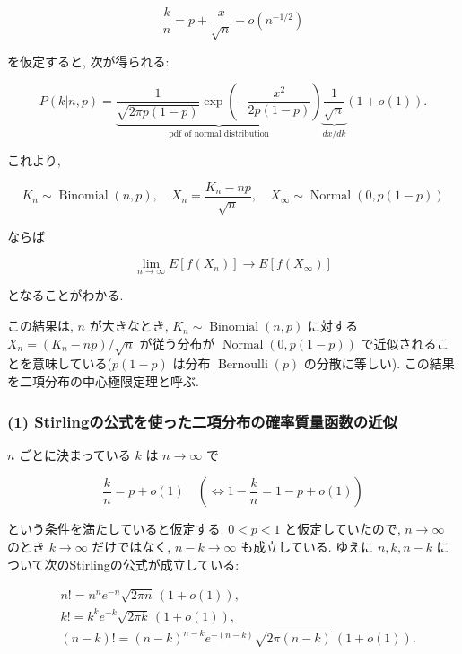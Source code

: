 \documentclass[
  letterpaper,
  DIV=11,
  numbers=noendperiod]{scrartcl}
\begin{document}
\[
\frac{k}{n} = p + \frac{x}{\sqrt{n}} + o(n^{-1/2})
\]

を仮定すると, 次が得られる:

\[
P(k|n,p) =
\underbrace{
\frac{1}{\sqrt{2\pi p(1-p)}} \exp\left(-\frac{x^2}{2p(1-p)}\right)
}_{\text{pdf of normal distribution}}
\underbrace{\frac{1}{\sqrt{n}}}_{dx/dk}
(1 + o(1)).
\]

これより,

\[
K_n \sim \operatorname{Binomial}(n, p), \quad
X_n = \frac{K_n - np}{\sqrt{n}}, \quad
X_\infty \sim \operatorname{Normal}(0, p(1-p))
\]

ならば

\[
\lim_{n\to\infty} E[f(X_n)] \to E[f(X_\infty)]
\]

となることがわかる.

この結果は, \(n\) が大きなとき,
\(K_n \sim \operatorname{Binomial}(n, p)\) に対する
\(X_n = (K_n - np)/\sqrt{n}\) が従う分布が
\(\operatorname{Normal}(0, p(1-p))\)
で近似されることを意味している(\(p(1-p)\) は分布
\(\operatorname{Bernoulli}(p)\) の分散に等しい).
この結果を二項分布の中心極限定理と呼ぶ.

\hypertarget{stirlingux306eux516cux5f0fux3092ux4f7fux3063ux305fux4e8cux9805ux5206ux5e03ux306eux78baux7387ux8ceaux91cfux51fdux6570ux306eux8fd1ux4f3c}{%
\subsubsection{(1)
Stirlingの公式を使った二項分布の確率質量函数の近似}\label{stirlingux306eux516cux5f0fux3092ux4f7fux3063ux305fux4e8cux9805ux5206ux5e03ux306eux78baux7387ux8ceaux91cfux51fdux6570ux306eux8fd1ux4f3c}}

\(n\) ごとに決まっている \(k\) は \(n\to\infty\) で

\[
\frac{k}{n} = p + o(1) \quad \left(\!\!\iff 1 - \frac{k}{n} = 1 - p + o(1)\right)
\]

という条件を満たしていると仮定する. \(0<p<1\) と仮定していたので,
\(n\to\infty\) のとき \(k\to\infty\) だけではなく, \(n-k\to\infty\)
も成立している. ゆえに \(n,k,n-k\)
について次のStirlingの公式が成立している:

\[
\begin{aligned}
&
n! = n^n e^{-n} \sqrt{2\pi n}\,(1 + o(1)), 
\\ &
k! = k^k e^{-k} \sqrt{2\pi k}\,(1 + o(1)),
\\ &
(n-k)! = (n-k)^{n-k} e^{-(n-k)} \sqrt{2\pi (n-k)}\,(1 + o(1)). 
\end{aligned}
\]
\end{document}
